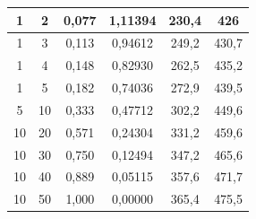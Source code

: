 \documentclass[a4paper, 12pt]{article}
\begin{document}
\begin{table}[h!]
\begin{center}
\begin{tabular}{|c|c|c|c|c|c|}
1                                                                   & 2                                                                    & 0,077          & 1,11394 & 230,4                                                      & 426                                                      \\ \hline
1                                                                   & 3                                                                    & 0,113          & 0,94612 & 249,2                                                      & 430,7                                                    \\ \hline
1                                                                   & 4                                                                    & 0,148          & 0,82930 & 262,5                                                      & 435,2                                                    \\ \hline
1                                                                   & 5                                                                    & 0,182          & 0,74036 & 272,9                                                      & 439,5                                                    \\ \hline
5                                                                   & 10                                                                   & 0,333          & 0,47712 & 302,2                                                      & 449,6                                                    \\ \hline
10                                                                  & 20                                                                   & 0,571          & 0,24304 & 331,2                                                      & 459,6                                                    \\ \hline
10                                                                  & 30                                                                   & 0,750          & 0,12494 & 347,2                                                      & 465,6                                                    \\ \hline
10                                                                  & 40                                                                   & 0,889          & 0,05115 & 357,6                                                      & 471,7                                                    \\ \hline
10                                                                  & 50                                                                   & 1,000          & 0,00000 & 365,4                                                      & 475,5                                                    \\ \hline
\end{tabular}
\end{center}
\end{table}
\end{document}
